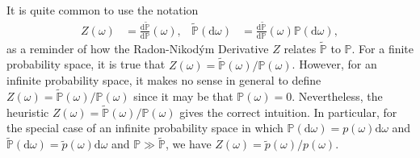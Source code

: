 \documentclass[12pt]{book}
\numberwithin{equation}{chapter}
\theoremstyle{plain}
\numberwithin{theorem}{section}
\theoremstyle{definition}
\newtheorem{definition}[theorem]{\underline{Definition}}
\numberwithin{exercise}{chapter}
\newcommand{\<}{\langle}
\renewcommand{\>}{\rangle}
\renewcommand{\(}{\left(}
\renewcommand{\)}{\right)}
\renewcommand{\[}{\left[}
\renewcommand{\]}{\right]}
\newcommand\Pb{\mathds{P}}
\newcommand\Fc{\mathscr{F}}
\newcommand\om{\omega}
\newcommand\Om{\Omega}
\newcommand\Pbt{\widetilde{\Pb}}
\newcommand\pt{\widetilde{p}}
\newcommand\dd{\mathrm{d}}
\begin{document}

\noindent
It is quite common to use the notation
\begin{align}
Z(\om)
	&=	\frac{\dd \Pbt}{\dd \Pb}(\om) , &
\Pbt(\dd \om)
	&=	\frac{\dd \Pbt}{\dd \Pb}(\om) \Pb(\dd \om) ,
\end{align}
as a reminder of how the Radon-Nikod\'ym Derivative $Z$ relates $\Pbt$ to $\Pb$.
For a finite probability space, it is true that $Z(\om) = \Pbt(\om)/\Pb(\om)$.  
However, for an infinite probability space, it makes no sense in general to define $Z(\om)=\Pbt(\om)/\Pb(\om)$ since it may be that $\Pb(\om) = 0$.  Nevertheless, the heuristic $Z(\om) = \Pbt(\om)/\Pb(\om)$ gives the correct intuition.  In particular, for the special case of an infinite probability space in which $\Pb(\dd \om) = p(\om) \dd \om$ and $\Pbt(\dd \om) = \pt(\om) \dd \om$ and $\Pb \gg \Pbt$, we have $Z(\om) = \pt(\om) / p(\om)$.  
\end{document}
